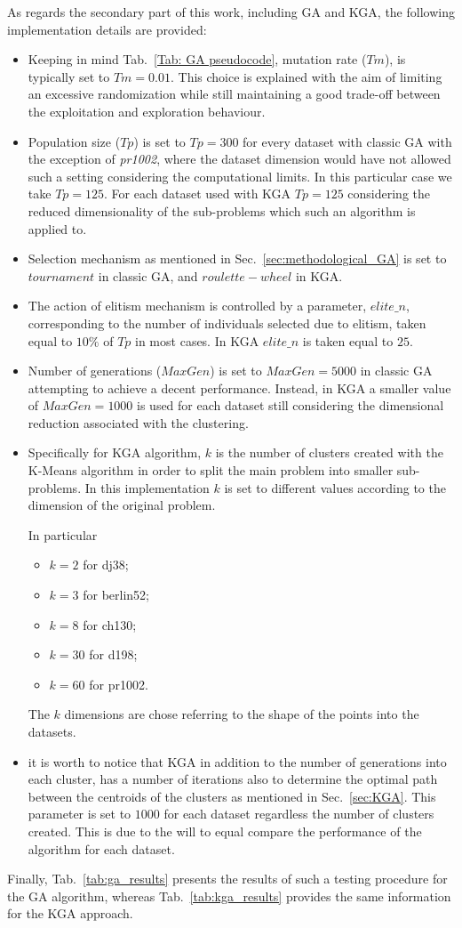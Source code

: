 \documentclass[10pt]{article}
\begin{document}
As regards the secondary part of this work, including GA and KGA, the following implementation details are provided:
\begin{itemize}
\item Keeping in mind Tab.~\ref{Tab: GA pseudocode}, mutation rate ($Tm$), is typically set to $Tm = 0.01$. 
This choice is explained with the aim of limiting an excessive randomization while still maintaining a good trade-off between the exploitation and exploration behaviour.
\item Population size ($Tp$) is set to $Tp = 300$ for every dataset with classic GA with the exception of \textit{pr1002}, where the dataset dimension would have not allowed such a setting considering the computational limits. 
In this particular case we take $Tp = 125$. 
For each dataset used with KGA $Tp = 125$ considering the reduced dimensionality of the sub-problems which such an algorithm is applied to.
\item Selection mechanism as mentioned in Sec.~\ref{sec:methodological_GA} is set to $tournament$ in classic GA, and $roulette-wheel$ in KGA.
\item The action of elitism mechanism is controlled by a parameter, $elite\_n$,  corresponding to the number of individuals selected due to elitism, taken equal to $10\%$ of $Tp$ in most cases. In KGA $elite\_n$ is taken equal to $25$.
\item Number of generations ($MaxGen$) is set to $MaxGen = 5000$ in classic GA attempting to achieve a decent performance.
Instead, in KGA a smaller value of $MaxGen = 1000$ is used for each dataset still considering the dimensional reduction associated with the clustering.
\item Specifically for KGA algorithm, $k$ is the number of clusters created with the K-Means algorithm in order to split the main problem into smaller sub-problems. In this implementation $k$ is set to different values according to the dimension of the original problem.

In particular
\begin{itemize}
\item $k = 2$ for dj38;
\item $k = 3$ for berlin52;
\item $k = 8$ for ch130;
\item $k = 30$ for d198;
\item $k = 60$ for pr1002.
\end{itemize}
The $k$ dimensions are chose referring to the shape of the points into the datasets.
\item it is worth to notice that KGA in addition to the number of generations into each cluster, has a number of iterations also to determine the optimal path between the centroids of the clusters as mentioned in Sec.~\ref{sec:KGA}. This parameter is set to $1000$ for each dataset regardless the number of clusters created. This is due to the will to equal compare the performance of the algorithm for each dataset.
\end{itemize}
Finally, Tab.~\ref{tab:ga_results} presents the results of such a testing procedure for the GA algorithm, whereas Tab.~\ref{tab:kga_results} provides the same information for the KGA approach.
\end{document}
